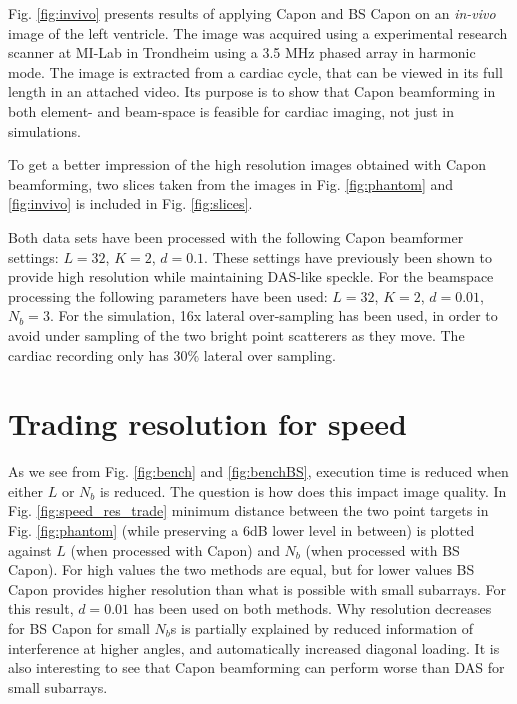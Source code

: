 \documentclass[12pt,journal,onecolumn]{IEEEtran}
\begin{document}
Fig. \ref{fig:invivo} presents results of applying Capon and BS Capon on an \textit{in-vivo} image of the left ventricle. The image was acquired using a experimental research scanner at MI-Lab in Trondheim using a 3.5 MHz phased array in harmonic mode. The image is extracted from a cardiac cycle, that can be viewed in its full length in an attached video. Its purpose is to show that Capon beamforming in both element- and beam-space is feasible for cardiac imaging, not just in simulations.

To get a better impression of the high resolution images obtained with Capon beamforming, two slices taken from the images in Fig. \ref{fig:phantom} and \ref{fig:invivo} is included in Fig. \ref{fig:slices}.

Both data sets have been processed with the following Capon beamformer settings: $L = 32$, $K = 2$, $d=0.1$. These settings have previously been shown to provide high resolution while maintaining DAS-like speckle\cite{Synnevag2007a}. For the beamspace processing the following parameters have been used: $L=32$, $K=2$, $d=0.01$, $N_b=3$. For the simulation, 16x lateral over-sampling has been used, in order to avoid under sampling of the two bright point scatterers as they move. The cardiac recording only has $30\%$ lateral over sampling.

\section{Trading resolution for speed}
As we see from Fig. \ref{fig:bench} and \ref{fig:benchBS}, execution time is reduced when either $L$ or $N_b$ is reduced. The question is how does this impact image quality. In Fig. \ref{fig:speed_res_trade} minimum distance between the two point targets in Fig. \ref{fig:phantom} (while preserving a 6dB lower level in between) is plotted against $L$ (when processed with Capon) and $N_b$ (when processed with BS Capon). For high values the two methods are equal, but for lower values BS Capon provides higher resolution than what is possible with small subarrays. For this result, $d=0.01$ has been used on both methods. Why resolution decreases for BS Capon for small $N_b$s is partially explained by reduced information of interference at higher angles, and automatically increased diagonal loading. It is also interesting to see that Capon beamforming can perform worse than DAS for small subarrays. 
\end{document}
